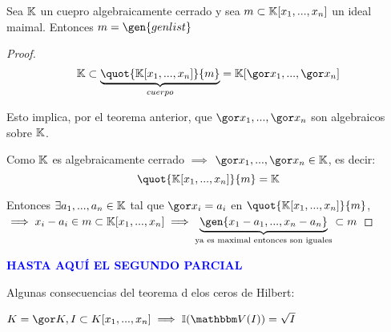 \begin{theorem}
	Sea $\mathbb{K}$ un cuepro algebraicamente cerrado y sea $m \subset \mathbb{K}[x_1,...,x_n]$ un ideal maimal. Entonces $m=\gen{genlist}$
\end{theorem}

\begin{proof}
 $$ \K \subset \underbrace{\quot{\K[x_1,...,x_n]}{m}}_{cuerpo} = \K[\cls{x_1},...,\cls{x_n}]$$

 Esto implica, por el teorema anterior, que $\cls{x_1},...,\cls{x_n}$ son algebraicos sobre $\mathbb{K}$.

 Como $\mathbb{K}$ es algebraicamente cerrado $\implies$ $\cls{x_1},...,\cls{x_n} \in \K$, es decir:
 $$ \quot{\K[x_1,...,x_n]}{m}= \K $$

 Entonces $\exists a_1,...,a_n \in \mathbb{K}$ tal que $\cls{x_i}=a_i$ en $\quot{\K[x_1,...,x_n]}{m}$, $\implies x_i-a_i \in m\subset \K[x_1,...,x_n] \implies \underbrace{\gen{x_1-a_1,...,x_n-a_n}}_{\text{ya es maximal entonces son iguales}} \subset m$
\end{proof}

\textcolor{blue}{\textbf{HASTA AQUÍ EL SEGUNDO PARCIAL}}

Algunas consecuencias del teorema d elos ceros de Hilbert:

$K=\cls{K}, I\subset K[x_1,...,x_n] \implies \I(\V(I))=\sqrt{I}$


